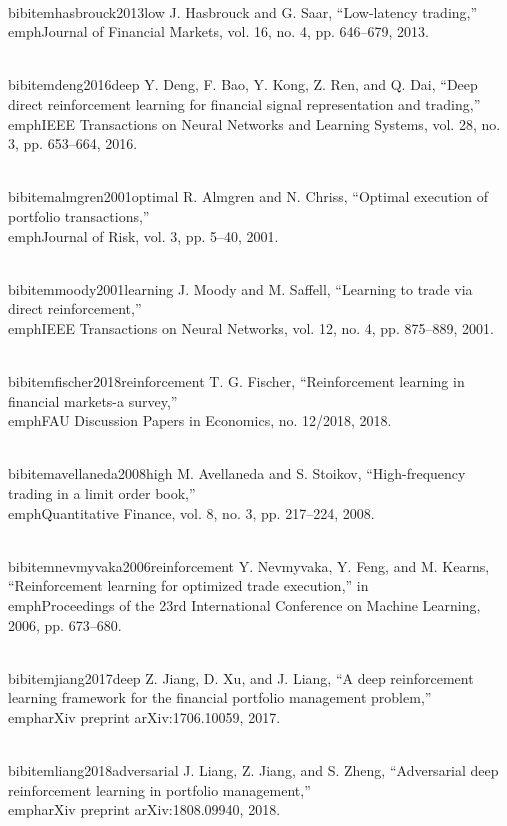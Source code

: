 \documentclass[11pt,a4paper]{article}
\begin{document}
\\bibitem{hasbrouck2013low}
J. Hasbrouck and G. Saar, ``Low-latency trading,'' \\emph{Journal of Financial Markets}, vol. 16, no. 4, pp. 646--679, 2013.

\\bibitem{deng2016deep}
Y. Deng, F. Bao, Y. Kong, Z. Ren, and Q. Dai, ``Deep direct reinforcement learning for financial signal representation and trading,'' \\emph{IEEE Transactions on Neural Networks and Learning Systems}, vol. 28, no. 3, pp. 653--664, 2016.

\\bibitem{almgren2001optimal}
R. Almgren and N. Chriss, ``Optimal execution of portfolio transactions,'' \\emph{Journal of Risk}, vol. 3, pp. 5--40, 2001.

\\bibitem{moody2001learning}
J. Moody and M. Saffell, ``Learning to trade via direct reinforcement,'' \\emph{IEEE Transactions on Neural Networks}, vol. 12, no. 4, pp. 875--889, 2001.

\\bibitem{fischer2018reinforcement}
T. G. Fischer, ``Reinforcement learning in financial markets-a survey,'' \\emph{FAU Discussion Papers in Economics}, no. 12/2018, 2018.

\\bibitem{avellaneda2008high}
M. Avellaneda and S. Stoikov, ``High-frequency trading in a limit order book,'' \\emph{Quantitative Finance}, vol. 8, no. 3, pp. 217--224, 2008.

\\bibitem{nevmyvaka2006reinforcement}
Y. Nevmyvaka, Y. Feng, and M. Kearns, ``Reinforcement learning for optimized trade execution,'' in \\emph{Proceedings of the 23rd International Conference on Machine Learning}, 2006, pp. 673--680.

\\bibitem{jiang2017deep}
Z. Jiang, D. Xu, and J. Liang, ``A deep reinforcement learning framework for the financial portfolio management problem,'' \\emph{arXiv preprint arXiv:1706.10059}, 2017.

\\bibitem{liang2018adversarial}
J. Liang, Z. Jiang, and S. Zheng, ``Adversarial deep reinforcement learning in portfolio management,'' \\emph{arXiv preprint arXiv:1808.09940}, 2018.
\end{document}
